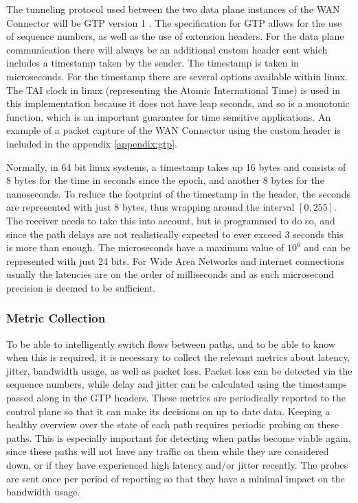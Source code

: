The tunneling protocol used between the two data plane instances of the WAN Connector will  be GTP version 1 \cite{3gpp.29.060}. The specification for GTP allows for the use of sequence numbers, as well as the use of extension headers. For the data plane communication there will always be an additional custom header sent which includes a timestamp taken by the sender. The timestamp is taken in microseconds. For the timestamp there are several options available within linux. The TAI clock in linux (representing the Atomic International Time) is used in this implementation because it does not have leap seconds, and so is a monotonic function, which is an important guarantee for time sensitive applications. An example of a packet capture of the WAN Connector using the custom header is included in the appendix \ref{appendix:gtp}.

Normally, in 64 bit linux systems, a timestamp takes up 16 bytes and consists of 8 bytes for the time in seconds since the epoch, and another 8 bytes for the nanoseconds. To reduce the footprint of the timestamp in the header, the seconds are represented with just 8 bytes, thus wrapping around the interval $[0,255]$. The receiver needs to take this into account, but is programmed to do so, and since the path delays are not realistically expected to ever exceed 3 seconds this is more than enough. The microseconds have a maximum value of $10^6$ and can be represented with just 24 bits. For Wide Area Networks and internet connections usually the latencies are on the order of milliseconds and as such microsecond precision is deemed to be sufficient.

\subsubsection{Metric Collection}

To be able to intelligently switch flows between paths, and to be able to know when this is required, it is necessary to collect the relevant metrics about latency, jitter, bandwidth usage, as well as packet loss. Packet loss can be detected via the sequence numbers, while delay and jitter can be calculated using the timestamps passed along in the GTP headers. These metrics are periodically reported to the control plane so that it can make its decisions on up to date data. Keeping a healthy overview over the state of each path requires periodic probing on these paths. This is especially important for detecting when paths become viable again, since these paths will not have any traffic on them while they are considered down, or if they have experienced high latency and/or jitter recently. The probes are sent once per period of reporting so that they have a minimal impact on the bandwidth usage.

